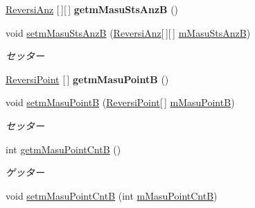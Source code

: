 \begin{DoxyCompactItemize}
\hyperlink{classjp_1_1gr_1_1java__conf_1_1yuta__yoshinaga_1_1reversi_1_1model_1_1_reversi_anz}{Reversi\+Anz} \mbox{[}$\,$\mbox{]}\mbox{[}$\,$\mbox{]} {\bfseries getm\+Masu\+Sts\+AnzB} ()
\item 
void \hyperlink{classjp_1_1gr_1_1java__conf_1_1yuta__yoshinaga_1_1reversi_1_1model_1_1_reversi_ad955214e48b277da67f8b0aa7a91f4e0}{setm\+Masu\+Sts\+AnzB} (\hyperlink{classjp_1_1gr_1_1java__conf_1_1yuta__yoshinaga_1_1reversi_1_1model_1_1_reversi_anz}{Reversi\+Anz}\mbox{[}$\,$\mbox{]}\mbox{[}$\,$\mbox{]} \hyperlink{classjp_1_1gr_1_1java__conf_1_1yuta__yoshinaga_1_1reversi_1_1model_1_1_reversi_afd4e2cb262d61e640b098b1563956bb6}{m\+Masu\+Sts\+AnzB})
\begin{DoxyCompactList}\small\item\em セッター \end{DoxyCompactList}\item 
\mbox{\label{classjp_1_1gr_1_1java__conf_1_1yuta__yoshinaga_1_1reversi_1_1model_1_1_reversi_afb6caed6814a12d02d7d9e2a7d7cd9ef}} 
\hyperlink{classjp_1_1gr_1_1java__conf_1_1yuta__yoshinaga_1_1reversi_1_1model_1_1_reversi_point}{Reversi\+Point} \mbox{[}$\,$\mbox{]} {\bfseries getm\+Masu\+PointB} ()
\item 
void \hyperlink{classjp_1_1gr_1_1java__conf_1_1yuta__yoshinaga_1_1reversi_1_1model_1_1_reversi_a84a16cc376a04c1fad8ad47a637f5363}{setm\+Masu\+PointB} (\hyperlink{classjp_1_1gr_1_1java__conf_1_1yuta__yoshinaga_1_1reversi_1_1model_1_1_reversi_point}{Reversi\+Point}\mbox{[}$\,$\mbox{]} \hyperlink{classjp_1_1gr_1_1java__conf_1_1yuta__yoshinaga_1_1reversi_1_1model_1_1_reversi_a544d45bb741e4436f2eae49d93ceb00c}{m\+Masu\+PointB})
\begin{DoxyCompactList}\small\item\em セッター \end{DoxyCompactList}\item 
int \hyperlink{classjp_1_1gr_1_1java__conf_1_1yuta__yoshinaga_1_1reversi_1_1model_1_1_reversi_ad2c4e4e56738790789c00c7ce53d1f24}{getm\+Masu\+Point\+CntB} ()
\begin{DoxyCompactList}\small\item\em ゲッター \end{DoxyCompactList}\item 
void \hyperlink{classjp_1_1gr_1_1java__conf_1_1yuta__yoshinaga_1_1reversi_1_1model_1_1_reversi_a9a80afb94b9a49bb92a0187385bf02a7}{setm\+Masu\+Point\+CntB} (int \hyperlink{classjp_1_1gr_1_1java__conf_1_1yuta__yoshinaga_1_1reversi_1_1model_1_1_reversi_ac49a25681eb3e227f42cc225803241d3}{m\+Masu\+Point\+CntB})

\end{DoxyCompactItemize}
